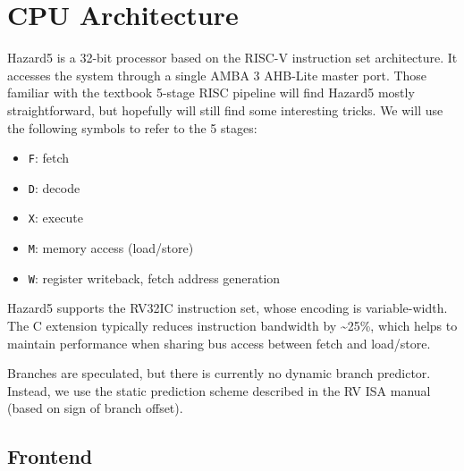 \documentclass[notitlepage]{article}
\begin{document}
\section{CPU Architecture}

Hazard5 is a 32-bit processor based on the RISC-V instruction set architecture. It accesses the system through a single AMBA 3 AHB-Lite master port. Those familiar with the textbook 5-stage RISC pipeline will find Hazard5 mostly straightforward, but hopefully will still find some interesting tricks. We will use the following symbols to refer to the 5 stages:

\begin{itemize}
\item {\tt F}: fetch
\item {\tt D}: decode
\item {\tt X}: execute
\item {\tt M}: memory access (load/store)
\item {\tt W}: register writeback, fetch address generation
\end{itemize}


Hazard5 supports the RV32IC instruction set, whose encoding is variable-width. The C extension typically reduces instruction bandwidth by \textasciitilde 25\%, which helps to maintain performance when sharing bus access between fetch and load/store.

Branches are speculated, but there is currently no dynamic branch predictor. Instead, we use the static prediction scheme described in the RV ISA manual (based on sign of branch offset).




\subsection{Frontend}
\label{section:frontend}
\end{document}
